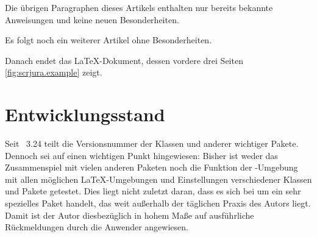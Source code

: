 %
Die übrigen Paragraphen dieses Artikels enthalten nur bereits bekannte
Anweisungen und keine neuen Besonderheiten.

%
Es folgt noch ein weiterer Artikel ohne Besonderheiten.

%
Danach endet das \LaTeX-Dokument, dessen vordere drei Seiten
\autoref{fig:scrjura.example} zeigt.%
%
\begin{figure}
  \setcapindent{0pt}%
  \label{fig:scrjura.example}
\end{figure}


\section{Entwicklungsstand}

Seit \KOMAScript~3.24 teilt  die Versionsnummer der Klassen
und anderer wichtiger Pakete. Dennoch sei auf einen wichtigen Punkt
hingewiesen: Bisher ist weder das Zusammenspiel mit vielen anderen Paketen
noch die Funktion der -Umgebung mit allen
möglichen \LaTeX-Umgebungen und Einstellungen verschiedener Klassen und Pakete
getestet. Dies liegt nicht zuletzt daran, dass es sich bei 
um ein sehr spezielles Paket handelt, das weit außerhalb der täglichen Praxis
des Autors liegt. Damit ist der Autor diesbezüglich in hohem Maße auf
ausführliche Rückmeldungen durch die Anwender angewiesen.%
\EndIndexGroup

